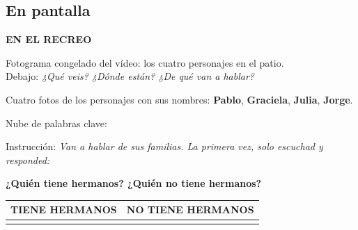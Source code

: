 \documentclass[a4paper,11pt]{article}
\begin{document}
\subsection*{En pantalla}

\begin{center}
{\Large\textbf{EN EL RECREO}}
\end{center}

\vspace{0.3cm}

Fotograma congelado del vídeo: los cuatro personajes en el patio.\\
Debajo: \textit{¿Qué veis? ¿Dónde están? ¿De qué van a hablar?}

\vspace{0.3cm}

Cuatro fotos de los personajes con sus nombres: \textbf{Pablo}, \textbf{Graciela}, \textbf{Julia}, \textbf{Jorge}.

\vspace{0.3cm}

\noindent Nube de palabras clave:

\begin{center}
\end{center}

\vspace{0.3cm}

Instrucción: \textit{Van a hablar de sus familias. La primera vez, solo escuchad y responded:}

\begin{center}
{\large\textbf{¿Quién tiene hermanos? ¿Quién no tiene hermanos?}}
\end{center}

\vspace{0.3cm}

\begin{center}
\renewcommand{\arraystretch}{1.5}
\begin{tabular}{|>{\centering\arraybackslash}p{6cm}|>{\centering\arraybackslash}p{6cm}|}
\hline
\rowcolor{verde!15}
\textbf{TIENE HERMANOS} & \textbf{NO TIENE HERMANOS} \\
\hline
 & \\[1cm]
\hline
\end{tabular}
\end{center}
\end{document}
